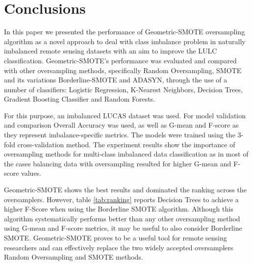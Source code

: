 \documentclass[parskip=full]{scrartcl}
\begin{document}
\section{Conclusions}

In this paper we presented the performance of Geometric-SMOTE oversampling
algorithm as a novel approach to deal with class imbalance problem in naturally
imbalanced remote sensing datasets  with an aim to improve the LULC
classification. Geometric-SMOTE's performance was evaluated and compared with
other oversampling methods, specifically Random Oversampling, SMOTE and its
variations Borderline-SMOTE and ADASYN, through the use of a number of
classifiers: Logistic Regression, K-Nearest Neighbors, Decision Trees, Gradient
Boosting Classifier and Random Forests.

For this purpose, an imbalanced LUCAS dataset was used. For model validation and
comparison Overall Accuracy was used, as well as G-mean and F-score as they
represent imbalance-specific metrics. The models were trained using the 3-fold
cross-validation method. The experiment results show the importance of
oversampling methods for multi-class imbalanced data classification as in most
of the cases balancing data with oversampling resulted for higher G-mean and F-
score values.

Geometric-SMOTE shows the best results and dominated the ranking across the
oversamplers. However, table \ref{tab:ranking} reports Decision Trees to achieve
a higher F-Score when using the Borderline SMOTE algorithm. Although this
algorithm systematically performs better than any other oversampling method
using G-mean and F-score metrics, it may be useful to also consider Borderline
SMOTE. Geometric-SMOTE proves to be a useful tool for remote sensing researchers
and can effectively replace the two widely accepted oversamplers Random
Oversampling and SMOTE methods.




\end{document}
